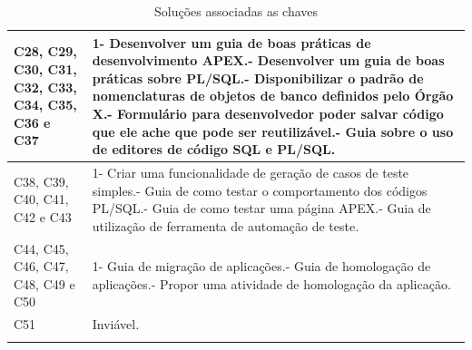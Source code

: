 \begin{longtable}{|M{2.0cm}|m{13.0cm}|}
C28, C29, C30, C31, C32, C33, C34, C35, C36 e C37 & 1- Desenvolver um guia de boas práticas de desenvolvimento APEX.- Desenvolver um guia de boas práticas sobre PL/SQL.- Disponibilizar o padrão de nomenclaturas de objetos de banco definidos pelo Órgão X.- Formulário para desenvolvedor poder salvar código que ele ache que pode ser reutilizável.- Guia sobre o uso de editores de código SQL e PL/SQL.                                                                                                                                       \\ \hline
C38, C39, C40, C41, C42 e C43                   & 1- Criar uma funcionalidade de geração de casos de teste simples.- Guia de como testar o comportamento dos códigos PL/SQL.- Guia de como testar uma página APEX.- Guia de utilização de ferramenta de automação de teste.                                                                                                                                                                                                                                                                               \\ \hline
C44, C45, C46, C47, C48, C49 e C50                & 1- Guia de migração de aplicações.- Guia de homologação de aplicações.- Propor uma atividade de homologação da aplicação.                                                                                                                                                                                                                                                                                                                                                                                   \\ \hline
C51                                              & Inviável.                                                                                                                                                                                                                                                                                                                                                                                                                                                                                                                                                      \\ \hline
\caption{Soluções associadas as chaves}
\end{longtable}

